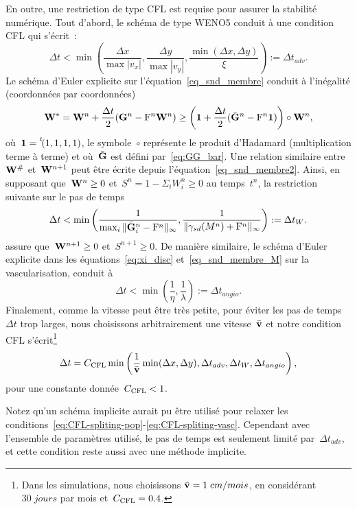 \documentclass[main.tex]{subfiles}
\begin{document}
En outre, une restriction de type CFL est requise pour assurer la stabilité numérique. Tout d'abord, le schéma de type WENO5 conduit à une condition CFL qui s'écrit~:
\begin{equation}\label{eq:CFL-weno}
\Delta t < \min \left( \frac{\Delta x}{\max |v_x|} , \frac{\Delta y}{\max |v_y|}, \frac{\min(\Delta x , \Delta y )}{\xi}\right) := \Delta t_{adv}.
\end{equation}
Le schéma d'Euler explicite sur l'équation~\eqref{eq_snd_membre} conduit à l'inégalité 
(coordonnées par coordonnées)
$$
{\bf W}^{*}={\bf W}^n+\frac{\Delta t}{2} ({\bf G}^n -{\rm F}^n{\bf W}^n) \geq 
\left( \mathbf{1}+\frac{\Delta t}{2} (\bar{{\bf G}}^n - {\rm F}^n\mathbf{1} )\right) \circ {\bf W}^n,
$$
où~$\mathbf{1}=\prescript{\mathit{t\!}}{}{(1,1,1,1)}$, le symbole~$\circ$ représente le produit d'Hadamard (multiplication terme à terme) et où~$\bar{{\bf G}}$ est défini par~\eqref{eq:GG_bar}. 
Une relation similaire entre~${\bf W}^\#$ et~${\bf W}^{n+1}$ 
peut être écrite depuis l'équation~\eqref{eq_snd_membre2}. 
Ainsi, en supposant que~${\bf W}^n\geq 0$ et~$S^n=1-\Sigma_i W^n_i\geq 0$ 
au temps~$t^n$, la restriction suivante sur le pas de temps
\begin{equation}\label{eq:CFL-spliting-pop}
\Delta t < \min \left( \dfrac{1}{ \max_i \|  \bar{{\bf G}}_i^n-{\rm F}^n \|_\infty} , \dfrac{1}{ \| \gamma_{sd}(M^n) + {\rm F}^n  \|_{\infty}} \right) := \Delta t_{W}.
\end{equation}
assure que~${\bf W}^{n+1}\geq 0$ et~$S^{n+1}\geq 0$. 
De manière similaire, le schéma d'Euler explicite dans les équations~\eqref{eq:xi_disc} et~\eqref{eq_snd_membre_M} 
sur la vascularisation, conduit à
\begin{equation}\label{eq:CFL-spliting-vasc}
\Delta t < \min \left(  \frac{1}{\eta} , \frac{1}{\lambda}\right) := \Delta t_{angio}.
\end{equation}
Finalement, comme la vitesse peut être très petite, pour éviter les pas de temps 
$\Delta t$ trop larges, nous choisissons arbitrairement une vitesse~$\bar{\mathbf{v}}$ et notre condition CFL s'écrit\footnote{Dans les simulations, nous choisissons 
$\bar{\mathbf{v}}=1\;cm/mois$, en considérant~$30\;jours$ par mois et~$C_{{\mathrm{CFL}}}=0.4$.} 
\begin{equation}\label{eq:dt}
\Delta t =C_{{\mathrm{CFL}}}\min \left( \frac{1}{{\bar{\mathbf{v}}}} \min( \Delta x, \Delta y) , \Delta t_{adv}, \Delta t_{W} , \Delta t_{angio} \right),
\end{equation}
pour une constante donnée~$C_{{\mathrm{CFL}}}<1$.

Notez qu'un schéma implicite aurait pu être utilisé pour relaxer les conditions~\eqref{eq:CFL-spliting-pop}-\eqref{eq:CFL-spliting-vasc}. 
Cependant avec l'ensemble de paramètres utilisé, le pas de temps est seulement limité par~$\Delta t_{adv}$, et cette condition reste aussi avec une méthode implicite. 
\end{document}
